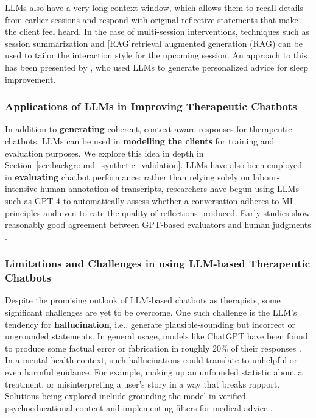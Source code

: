 LLMs also have a very long context window, which allows them to recall details from earlier sessions and respond with original reflective statements that make the client feel heard. In the case of multi-session interventions, techniques such as session summarization and [RAG]retrieval augmented generation (RAG) can be used to tailor the interaction style for the upcoming session. An approach to this has been presented by \cite{corda2024context}, who used LLMs to generate personalized advice for sleep improvement.


\subsubsection{Applications of LLMs in Improving Therapeutic Chatbots}
In addition to \textbf{generating} coherent, context-aware responses for therapeutic chatbots, LLMs can be used in \textbf{modelling the clients} for training and evaluation purposes. We explore this idea in depth in Section~\ref{sec:background_synthetic_validation}. LLMs have also been employed in \textbf{evaluating} chatbot performance: rather than relying solely on labour-intensive human annotation of transcripts, researchers have begun using LLMs such as GPT-4 to automatically assess whether a conversation adheres to MI principles and even to rate the quality of reflections produced. Early studies show reasonably good agreement between GPT-based evaluators and human judgments \cite{Scholich2025}. 


\subsubsection{Limitations and Challenges in using LLM-based Therapeutic Chatbots}
Despite the promising outlook of LLM-based chatbots as therapists, some significant challenges are yet to be overcome. One such challenge is the LLM's tendency for \textbf{hallucination}, i.e., generate plausible-sounding but incorrect or ungrounded statements. In general usage, models like ChatGPT have been found to produce some factual error or fabrication in roughly 20\% of their responses \cite{Li2023}. In a mental health context, such hallucinations could translate to unhelpful or even harmful guidance. For example, making up an unfounded statistic about a treatment, or misinterpreting a user's story in a way that breaks rapport. Solutions being explored include grounding the model in verified psychoeducational content and implementing filters for medical advice \cite{Amugongo2025RAG}.


